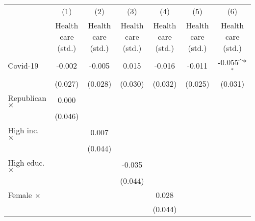 {
\def\sym#1{\ifmmode^{#1}\else\(^{#1}\)\fi}
\begin{tabular}{l*{6}{c}}
\toprule
                    &\multicolumn{1}{c}{(1)}&\multicolumn{1}{c}{(2)}&\multicolumn{1}{c}{(3)}&\multicolumn{1}{c}{(4)}&\multicolumn{1}{c}{(5)}&\multicolumn{1}{c}{(6)}\\
                    &\multicolumn{1}{c}{Health care (std.)}&\multicolumn{1}{c}{Health care (std.)}&\multicolumn{1}{c}{Health care (std.)}&\multicolumn{1}{c}{Health care (std.)}&\multicolumn{1}{c}{Health care (std.)}&\multicolumn{1}{c}{Health care (std.)}\\
\midrule
Covid-19            &      -0.002         &      -0.005         &       0.015         &      -0.016         &      -0.011         &      -0.055\sym{*}  \\
                    &     (0.027)         &     (0.028)         &     (0.030)         &     (0.032)         &     (0.025)         &     (0.031)         \\
\addlinespace
Republican $\times$ &       0.000         &                     &                     &                     &                     &                     \\
                    &     (0.046)         &                     &                     &                     &                     &                     \\
\addlinespace
High inc. $\times$  &                     &       0.007         &                     &                     &                     &                     \\
                    &                     &     (0.044)         &                     &                     &                     &                     \\
\addlinespace
High educ. $\times$ &                     &                     &      -0.035         &                     &                     &                     \\
                    &                     &                     &     (0.044)         &                     &                     &                     \\
\addlinespace
Female $\times$     &                     &                     &                     &       0.028         &                     &                     \\
                    &                     &                     &                     &     (0.044)         &                     &                     \\

\end{tabular}}
